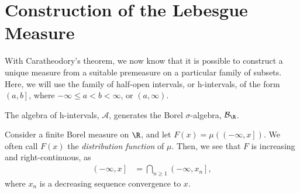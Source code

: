 \documentclass[10pt]{mypackage}
\begin{document}
\section{Construction of the Lebesgue Measure}%
With Caratheodory's theorem, we now know that it is possible to construct a unique measure from a suitable premeasure on a particular family of subsets. Here, we will use the family of half-open intervals, or h-intervals, of the form $\left( a,b \right]$, where $-\infty \leq a < b < \infty$, or $\left(a,\infty\right)$.\newline

The algebra of h-intervals, $\mathcal{A}$, generates the Borel $\sigma$-algebra, $\mathcal{B}_{\R}$.\newline

Consider a finite Borel measure on $\R$, and let $F(x) = \mu\left( \left( -\infty,x \right] \right)$. We often call $F(x)$ the \textit{distribution function} of $\mu$. Then, we see that $F$ is increasing and right-continuous, as
\begin{align*}
  \left( -\infty,x \right] &= \bigcap_{n\geq 1} \left( -\infty,x_n \right],
\end{align*}
where $x_n$ is a decreasing sequence convergence to $x$.\newline
\end{document}
